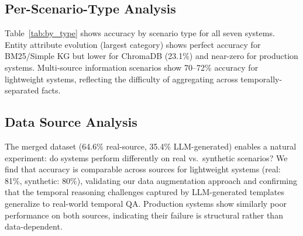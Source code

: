 \subsection{Per-Scenario-Type Analysis}
Table~\ref{tab:by_type} shows accuracy by scenario type for all seven systems.
Entity attribute evolution (largest category) shows perfect accuracy for BM25/Simple KG but lower for ChromaDB (23.1\%) and near-zero for production systems.
Multi-source information scenarios show 70--72\% accuracy for lightweight systems, reflecting the difficulty of aggregating across temporally-separated facts.

\begin{table}[t]
\centering
{}
\caption{Accuracy by scenario type (test set). Naive RAG results are identical to FAISS and Simple KG.}
\label{tab:by_type}
\end{table}

\subsection{Data Source Analysis}
The merged dataset (64.6\% real-source, 35.4\% LLM-generated) enables a natural experiment: do systems perform differently on real vs.\ synthetic scenarios?
We find that accuracy is comparable across sources for lightweight systems (real: 81\%, synthetic: 80\%), validating our data augmentation approach and confirming that the temporal reasoning challenges captured by LLM-generated templates generalize to real-world temporal QA.
Production systems show similarly poor performance on both sources, indicating their failure is structural rather than data-dependent.
